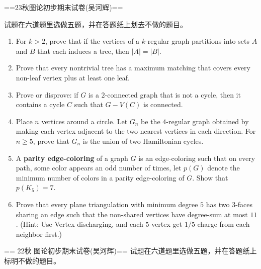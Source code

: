 ==23秋图论初步期末试卷(吴河辉)==

试题在六道题里选做五题，并在答题纸上划去不做的题目。

\begin{enumerate}
    \item For \( k > 2 \), prove that if the vertices of a \( k \)-regular graph partitions into sets \( A \) and \( B \) that each induces a tree, then \( |A| = |B| \).

    \item Prove that every nontrivial tree has a maximum matching that covers every non-leaf vertex plus at least one leaf.

    \item Prove or disprove: if \( G \) is a $2$-connected graph that is not a cycle, then it contains a cycle \( C \) such that \( G - V(C) \) is connected.

    \item Place \( n \) vertices around a circle. Let \( G_n \) be the $4$-regular graph obtained by making each vertex adjacent to the two nearest vertices in each direction. For \( n \geq 5 \), prove that \( G_n \) is the union of two Hamiltonian cycles.

    \item A \textbf{parity edge-coloring} of a graph \( G \) is an edge-coloring such that on every path, some color appears an odd number of times, let \( p(G) \) denote the minimum number of colors in a parity edge-coloring of \( G \). Show that \( p(K_5) = 7 \).

    \item Prove that every plane triangulation with minimum degree $5$ has two $3$-faces sharing an edge such that the non-shared vertices have degree-sum at most $11$. (Hint: Use Vertex discharging, and each $5$-vertex get $1/5$ charge from each neighbor first.)
\end{enumerate}

== 22秋 图论初步期末试卷(吴河辉)==
试题在六道题里选做五题，并在答题纸上标明不做的题目。

